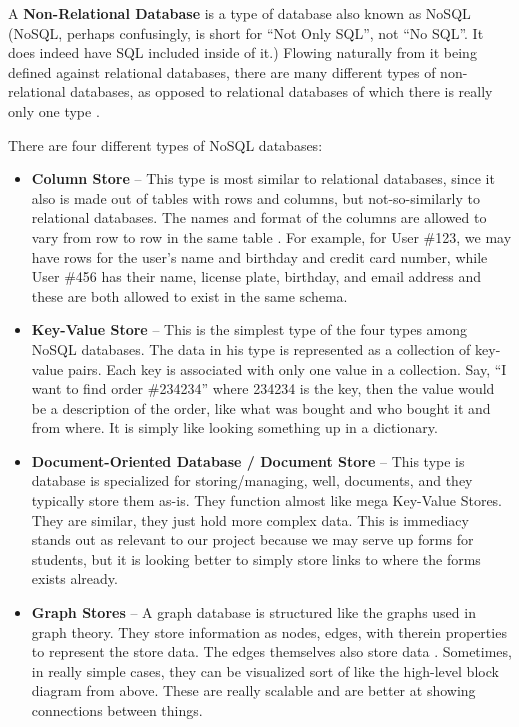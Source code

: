\documentclass[titlepage, 12pt]{article}
\begin{document}
A \textbf{Non-Relational Database} is a type of database also known as NoSQL (NoSQL, perhaps confusingly, is short for “Not Only SQL”, not “No SQL”. It does indeed have SQL included inside of it.) Flowing naturally from it being defined against relational databases, there are many different types of non-relational databases, as opposed to relational databases of which there is really only one type \cite{bib-2-1}.

There are four different types of NoSQL databases:

\begin{itemize}
    \item \textbf{Column Store} – This type is most similar to relational databases, since it also is made out of tables with rows and columns, but not-so-similarly to relational databases. The names and format of the columns are allowed to vary from row to row in the same table \cite{bib-2-3}. For example, for User \#123, we may have rows for the user’s name and birthday and credit card number, while User \#456 has their name, license plate, birthday, and email address and these are both allowed to exist in the same schema.
    \item \textbf{Key-Value Store} – This is the simplest type of the four types among NoSQL databases. The data in his type is represented as a collection of key-value pairs. Each key is associated with only one value in a collection. Say, “I want to find order \#234234” where 234234 is the key, then the value would be a description of the order, like what was bought and who bought it and from where. It is simply like looking something up in a dictionary.
    \item \textbf{Document-Oriented Database / Document Store} – This type is database is specialized for storing/managing, well, documents, and they typically store them as-is. They function almost like mega Key-Value Stores. They are similar, they just hold more complex data. This is immediacy stands out as relevant to our project because we may serve up forms for students, but it is looking better to simply store links to where the forms exists already.
    \item \textbf{Graph Stores} – A graph database is structured like the graphs used in graph theory. They store information as nodes, edges, with therein properties to represent the store data. The edges themselves also store data \cite{bib-2-4}. Sometimes, in really simple cases, they can be visualized sort of like the high-level block diagram from above. These are really scalable and are better at showing connections between things.
\end{itemize}
\end{document}
